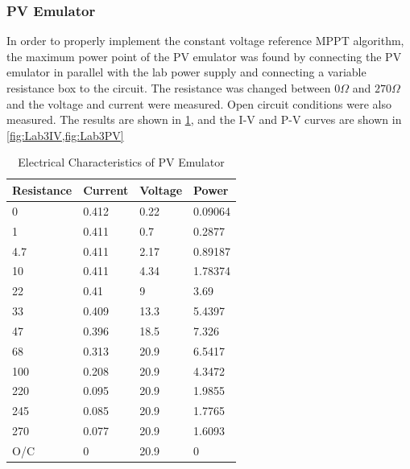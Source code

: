 \documentclass[]{article}
\begin{document}
            \subsubsection{PV Emulator}
                In order to properly implement the constant voltage reference MPPT algorithm, the maximum power point of the PV emulator was found by connecting the PV emulator in parallel with the lab power supply and connecting a variable resistance box to the circuit. The resistance was changed between $0\Omega$ and $270\Omega$ and the voltage and current were measured. Open circuit conditions were also measured. The results are shown in \cref{tbl:Lab3Emu}, and the I-V and P-V curves are shown in \cref{fig:Lab3IV,fig:Lab3PV}
                \begin{table}[H]
                    \centering
                    \begin{tabular}{|l|l|l|l|}
                        \hline
                        
                        Resistance & Current & Voltage & Power \\ \hline
                        0 & 0.412 & 0.22 & 0.09064 \\ \hline
                        1 & 0.411 & 0.7 & 0.2877 \\ \hline
                        4.7 & 0.411 & 2.17 & 0.89187 \\ \hline
                        10 & 0.411 & 4.34 & 1.78374 \\ \hline
                        22 & 0.41 & 9 & 3.69 \\ \hline
                        33 & 0.409 & 13.3 & 5.4397 \\ \hline
                        47 & 0.396 & 18.5 & 7.326 \\ \hline
                        68 & 0.313 & 20.9 & 6.5417 \\ \hline
                        100 & 0.208 & 20.9 & 4.3472 \\ \hline
                        220 & 0.095 & 20.9 & 1.9855 \\ \hline
                        245 & 0.085 & 20.9 & 1.7765 \\ \hline
                        270 & 0.077 & 20.9 & 1.6093 \\ \hline
                        O/C & 0 & 20.9 & 0 \\ \hline
                        
                        \end{tabular}
                        \caption{Electrical Characteristics of PV Emulator}
                        \label{tbl:Lab3Emu}
                    \end{table}
\end{document}

